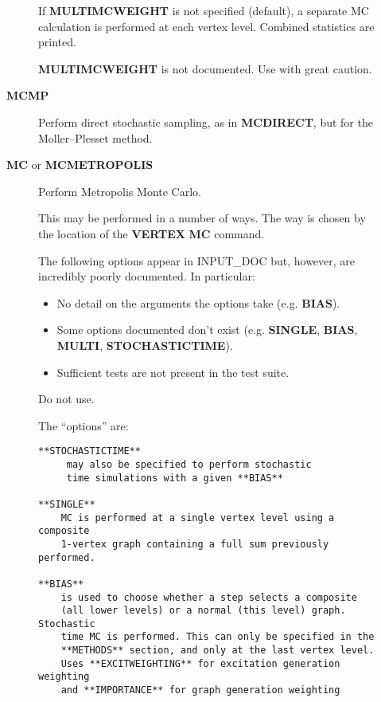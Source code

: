 \documentclass[openany,a4paper,10pt]{manual}
\begin{document}
\begin{description}
\begin{description}
If \textbf{MULTIMCWEIGHT} is not specified (default), a separate
MC calculation is performed at each vertex level.  Combined
statistics are printed.

\begin{notice}[warning]
\textbf{MULTIMCWEIGHT} is not documented.  Use with great caution.
\end{notice}

\item[\textbf{MCMP}]
Perform direct stochastic sampling, as in \textbf{MCDIRECT},
but for the Moller--Plesset method.

\item[\textbf{MC} or \textbf{MCMETROPOLIS}]
Perform Metropolis Monte Carlo.

This may be performed in a number of ways. The way is
chosen by the location of the \textbf{VERTEX} \textbf{MC} command.

\begin{notice}[warning]
The following options appear in INPUT\_DOC but, however, are incredibly
poorly documented.  In particular:
\begin{itemize}
\item {} 
No detail on the arguments the options take (e.g. \textbf{BIAS}).

\item {} 
Some options documented don't exist (e.g. \textbf{SINGLE}, \textbf{BIAS}, \textbf{MULTI}, \textbf{STOCHASTICTIME}).

\item {} 
Sufficient tests are not present in the test suite.

\end{itemize}

Do not use.

The ``options'' are:

\begin{Verbatim}[commandchars=@\[\]]
 **STOCHASTICTIME**
     may also be specified to perform stochastic
     time simulations with a given **BIAS**

**SINGLE**
    MC is performed at a single vertex level using a composite
    1-vertex graph containing a full sum previously performed.

**BIAS**
    is used to choose whether a step selects a composite
    (all lower levels) or a normal (this level) graph.  Stochastic
    time MC is performed. This can only be specified in the
    **METHODS** section, and only at the last vertex level.
    Uses **EXCITWEIGHTING** for excitation generation weighting
    and **IMPORTANCE** for graph generation weighting


\end{Verbatim}
\end{notice}
\end{description}
\end{description}
\end{document}
